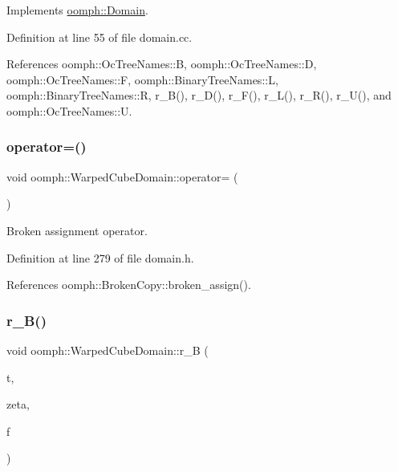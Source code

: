 Implements \hyperlink{classoomph_1_1Domain_a95f3e00d28ea37e6c4d3027bfac91096}{oomph\+::\+Domain}.



Definition at line 55 of file domain.\+cc.



References oomph\+::\+Oc\+Tree\+Names\+::B, oomph\+::\+Oc\+Tree\+Names\+::D, oomph\+::\+Oc\+Tree\+Names\+::F, oomph\+::\+Binary\+Tree\+Names\+::L, oomph\+::\+Binary\+Tree\+Names\+::R, r\+\_\+\+B(), r\+\_\+\+D(), r\+\_\+\+F(), r\+\_\+\+L(), r\+\_\+\+R(), r\+\_\+\+U(), and oomph\+::\+Oc\+Tree\+Names\+::U.

\mbox{\label{classoomph_1_1WarpedCubeDomain_a475e5275c5a93aa96c03509051cede55}} 
\subsubsection{\texorpdfstring{operator=()}{operator=()}}
{\footnotesize\ttfamily void oomph\+::\+Warped\+Cube\+Domain\+::operator= (\begin{DoxyParamCaption}\item[{const \hyperlink{classoomph_1_1WarpedCubeDomain}{Warped\+Cube\+Domain} \&}]{ }\end{DoxyParamCaption})\hspace{0.3cm}{\ttfamily [inline]}}



Broken assignment operator. 



Definition at line 279 of file domain.\+h.



References oomph\+::\+Broken\+Copy\+::broken\+\_\+assign().

\mbox{\label{classoomph_1_1WarpedCubeDomain_aa3bb55f2a3f50fde4693cabccf3efa7d}} 
\subsubsection{\texorpdfstring{r\+\_\+\+B()}{r\_B()}}
{\footnotesize\ttfamily void oomph\+::\+Warped\+Cube\+Domain\+::r\+\_\+B (\begin{DoxyParamCaption}\item[{const unsigned \&}]{t,  }\item[{const \hyperlink{classoomph_1_1Vector}{Vector}$<$ double $>$ \&}]{zeta,  }\item[{\hyperlink{classoomph_1_1Vector}{Vector}$<$ double $>$ \&}]{f }\end{DoxyParamCaption})\hspace{0.3cm}{\ttfamily [private]}}



